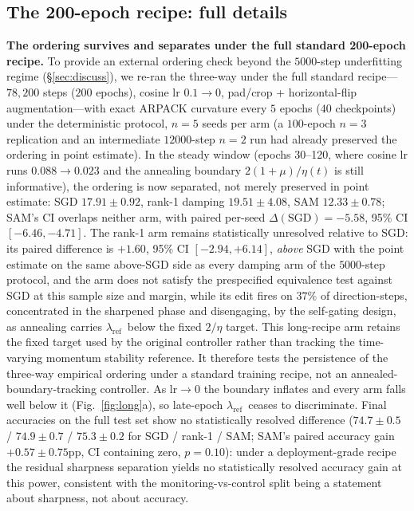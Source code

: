 \documentclass{article}
\theoremstyle{plain}
\theoremstyle{definition}
\theoremstyle{remark}
\newcommand{\lref}{\ensuremath{\lambda_{\mathrm{ref}}}}
\begin{document}
\subsection{The 200-epoch recipe: full details}
\label{sub:longrecipe}
\textbf{The ordering survives and separates under the full standard
200-epoch recipe.} To provide an external ordering check beyond the
$5000$-step underfitting regime
(\S\ref{sec:discuss}), we re-ran the three-way under the full standard
recipe---$78{,}200$ steps ($200$ epochs), cosine lr $0.1\!\to\!0$, pad/crop +
horizontal-flip augmentation---with exact ARPACK curvature every $5$ epochs
($40$ checkpoints) under the deterministic protocol, $n{=}5$ seeds per arm (a
$100$-epoch $n{=}3$ replication and an intermediate $12000$-step $n{=}2$ run
had already preserved the ordering in point estimate). In the steady window
(epochs 30--120, where cosine lr runs $0.088\!\to\!0.023$ and the annealing
boundary $2(1{+}\mu)/\eta(t)$ is still informative), the ordering is now
separated, not merely preserved in point estimate: SGD $17.91\pm0.92$, rank-1
damping $19.51\pm4.08$, SAM $12.33\pm0.78$; SAM's CI overlaps neither arm,
with paired per-seed $\Delta(\mathrm{SGD})={-}5.58$, 95\% CI
$[{-}6.46,{-}4.71]$. The rank-1 arm remains statistically unresolved
relative to SGD: its paired difference is $+1.60$, 95\% CI
$[{-}2.94,{+}6.14]$, \emph{above} SGD with the point estimate on the
same above-SGD side as every damping arm of the $5000$-step protocol,
and the arm does not satisfy the prespecified equivalence test against
SGD at this sample size and margin, while its
edit fires on $37\%$ of direction-steps, concentrated in the sharpened
phase and disengaging, by the self-gating design, as annealing carries \lref\
below the fixed $2/\eta$ target. This long-recipe arm retains the
fixed target used by the original controller rather than tracking the
time-varying momentum stability reference. It therefore tests the
persistence of the three-way empirical ordering under a standard
training recipe, not an annealed-boundary-tracking controller. As
$\mathrm{lr}\!\to\!0$ the boundary inflates and every arm falls well below it
(Fig.~\ref{fig:long}a), so late-epoch \lref\ ceases to discriminate. Final
accuracies on the full test set show no statistically resolved
difference
($74.7\pm0.5$ / $74.9\pm0.7$ / $75.3\pm0.2$ for SGD / rank-1 / SAM; SAM's
paired accuracy gain $+0.57\pm0.75$pp, CI containing zero, $p{=}0.10$):
under a deployment-grade
recipe the residual sharpness separation yields no statistically resolved
accuracy gain at this
power, consistent with the monitoring-vs-control split being a statement
about sharpness, not about accuracy.
\end{document}
